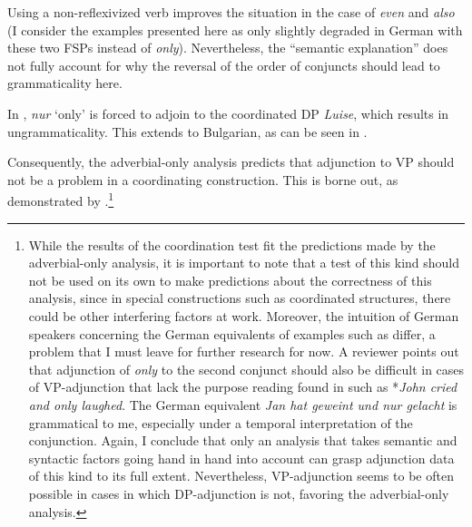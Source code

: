 \documentclass[output=paper,colorlinks,citecolor=brown]{langscibook}
\begin{document}
\noindent Using a non-reflexivized verb improves the situation in the case of \textit{even} and \textit{also} (I consider the examples presented here as only slightly degraded in German with these two FSPs instead of \textit{only}). Nevertheless, the ``semantic explanation'' does not fully account for why the reversal of the order of conjuncts should lead to grammaticality here.

In , \textit{nur} `only' is forced to adjoin to the coordinated DP \textit{Luise}, which results in ungrammaticality. This extends to Bulgarian, as can be seen in . 

\label{Bulgariancoordination:1}
\z 

\newpage
\noindent Consequently, the adverbial-only analysis predicts that adjunction to VP should not be a problem in a coordinating construction. This is borne out, as demonstrated by .\footnote{While the results of the coordination test fit the predictions made by the adverbial-only analysis, it is important to note that a test of this kind should not be used on its own to make predictions about the correctness of this analysis, since in special constructions such as coordinated structures, there could be other interfering factors at work. Moreover, the intuition of German speakers concerning the German equivalents of examples such as  differ, a problem that I must leave for further research for now. A reviewer points out that adjunction of \textit{only} to the second conjunct should also be difficult in cases of VP-adjunction that lack the purpose reading found in  such as *\textit{John cried and only laughed}. The German equivalent \textit{Jan hat geweint und nur gelacht} is grammatical to me, especially under a temporal interpretation of the conjunction. Again, I conclude that only an analysis that takes semantic and syntactic factors going hand in hand into account can grasp adjunction data of this kind to its full extent. Nevertheless, VP-adjunction seems to be often possible in cases in which DP-adjunction is not, favoring the adverbial-only analysis.}
\end{document}

